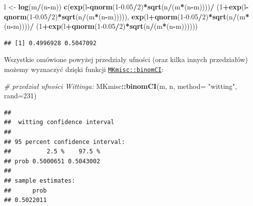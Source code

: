 \documentclass[polish,]{book}
\newenvironment{Shaded}{\begin{snugshade}}{\end{snugshade}}
\newcommand{\CommentTok}[1]{\textcolor[rgb]{0.56,0.35,0.01}{\textit{#1}}}
\newcommand{\DataTypeTok}[1]{\textcolor[rgb]{0.13,0.29,0.53}{#1}}
\newcommand{\DecValTok}[1]{\textcolor[rgb]{0.00,0.00,0.81}{#1}}
\newcommand{\FloatTok}[1]{\textcolor[rgb]{0.00,0.00,0.81}{#1}}
\newcommand{\KeywordTok}[1]{\textcolor[rgb]{0.13,0.29,0.53}{\textbf{#1}}}
\newcommand{\NormalTok}[1]{#1}
\newcommand{\OperatorTok}[1]{\textcolor[rgb]{0.81,0.36,0.00}{\textbf{#1}}}
\newcommand{\StringTok}[1]{\textcolor[rgb]{0.31,0.60,0.02}{#1}}
\begin{document}
\begin{Shaded}
\begin{Highlighting}[]
\NormalTok{l <-}\StringTok{ }\KeywordTok{log}\NormalTok{(m}\OperatorTok{/}\NormalTok{(n}\OperatorTok{-}\NormalTok{m))}
\KeywordTok{c}\NormalTok{(}\KeywordTok{exp}\NormalTok{(l}\OperatorTok{-}\KeywordTok{qnorm}\NormalTok{(}\DecValTok{1}\FloatTok{-0.05}\OperatorTok{/}\DecValTok{2}\NormalTok{)}\OperatorTok{*}\KeywordTok{sqrt}\NormalTok{(n}\OperatorTok{/}\NormalTok{(m}\OperatorTok{*}\NormalTok{(n}\OperatorTok{-}\NormalTok{m))))}\OperatorTok{/}
\StringTok{ }\NormalTok{(}\DecValTok{1}\OperatorTok{+}\KeywordTok{exp}\NormalTok{(l}\OperatorTok{-}\KeywordTok{qnorm}\NormalTok{(}\DecValTok{1}\FloatTok{-0.05}\OperatorTok{/}\DecValTok{2}\NormalTok{)}\OperatorTok{*}\KeywordTok{sqrt}\NormalTok{(n}\OperatorTok{/}\NormalTok{(m}\OperatorTok{*}\NormalTok{(n}\OperatorTok{-}\NormalTok{m))))),}
\KeywordTok{exp}\NormalTok{(l}\OperatorTok{+}\KeywordTok{qnorm}\NormalTok{(}\DecValTok{1}\FloatTok{-0.05}\OperatorTok{/}\DecValTok{2}\NormalTok{)}\OperatorTok{*}\KeywordTok{sqrt}\NormalTok{(n}\OperatorTok{/}\NormalTok{(m}\OperatorTok{*}\NormalTok{(n}\OperatorTok{-}\NormalTok{m))))}\OperatorTok{/}
\StringTok{ }\NormalTok{(}\DecValTok{1}\OperatorTok{+}\KeywordTok{exp}\NormalTok{(l}\OperatorTok{+}\KeywordTok{qnorm}\NormalTok{(}\DecValTok{1}\FloatTok{-0.05}\OperatorTok{/}\DecValTok{2}\NormalTok{)}\OperatorTok{*}\KeywordTok{sqrt}\NormalTok{(n}\OperatorTok{/}\NormalTok{(m}\OperatorTok{*}\NormalTok{(n}\OperatorTok{-}\NormalTok{m))))))}
\end{Highlighting}
\end{Shaded}

\begin{verbatim}
## [1] 0.4996928 0.5047092
\end{verbatim}

Wszystkie omówione powyżej przedziały ufności (oraz kilka innych przedziałów)
możemy wyznaczyć dzięki funkcji \href{https://rdrr.io/cran/MKmisc/man/binomCI.html}{\texttt{MKmisc::binomCI}}:

\begin{Shaded}
\begin{Highlighting}[]
\CommentTok{# przedział ufności Wittinga:}
\NormalTok{MKmisc}\OperatorTok{::}\KeywordTok{binomCI}\NormalTok{(m, n, }\DataTypeTok{method=} \StringTok{"witting"}\NormalTok{, }\DataTypeTok{rand=}\DecValTok{231}\NormalTok{)}
\end{Highlighting}
\end{Shaded}

\begin{verbatim}
## 
##  witting confidence interval
## 
## 95 percent confidence interval:
##          2.5 %    97.5 %
## prob 0.5000651 0.5043002
## 
## sample estimates:
##      prob 
## 0.5022011
\end{verbatim}
\end{document}
